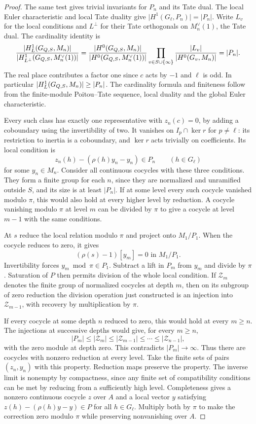 \begin{proof}
The same test gives trivial invariants for \(P_n\) and its Tate
dual. The local Euler characteristic and local Tate duality give
\(\lvert H^1(G_\ell,P_n)\rvert=\lvert P_n\rvert\). Write
\(L_v\) for the local conditions and \(L^\perp\) for their
Tate orthogonals on \(M_n^\vee(1)\), the Tate dual. The
cardinality identity is
\[
 \frac{|H^1_L(G_{Q,S},M_n)|}
 {|H^1_{L^\perp}(G_{Q,S},M_n^\vee(1))|}
 =\frac{|H^0(G_{Q,S},M_n)|}{|H^0(G_{Q,S},M_n^\vee(1))|}
 \prod_{v\in S\cup\{\infty\}}\frac{|L_v|}{|H^0(G_v,M_n)|}
 =|P_n|.
\]
The real place contributes a factor one since \(c\) acts
by \(-1\) and \(\ell\) is odd. In particular
\(|H^1_L(G_{Q,S},M_n)|\geq |P_n|\). The cardinality formula
and finiteness follow from the finite-module Poitou--Tate sequence,
local duality and the global Euler characteristic.
\cite[Chapter I, Theorems 4.10 and 5.1]{milne-duality}

Every such class has exactly one representative with \(z_n(c)=0\),
by adding a coboundary using the invertibility of two. It vanishes on
\(I_p\cap\ker r\) for \(p\ne\ell\): its restriction to inertia is
a coboundary, and \(\ker r\) acts trivially on coefficients. Its
local condition is
\[
 z_n(h)-(\rho(h)y_n-y_n)\in P_n\qquad(h\in G_\ell)
\]
for some \(y_n\in M_n\). Consider all continuous cocycles with these
three conditions. They form a finite group for each \(n\), since
they are normalized and unramified outside \(S\), and its size is
at least \(\lvert P_n\rvert\). If at some level every such cocycle
vanished modulo \(\pi\), this would also hold at every higher
level by reduction. A cocycle vanishing modulo \(\pi\) at level
\(m\) can be divided by \(\pi\) to give a cocycle at level \(m-1\)
with the same conditions.

At \(s\) reduce the local relation modulo \(\pi\) and project
onto \(M_1/P_1\). When the cocycle reduces to zero, it gives
\[
       (\rho(s)-1)[y_m]=0\text{ in }M_1/P_1 .
\]
Invertibility forces \(y_m\bmod\pi\in P_1\).
Subtract a lift in \(P_m\) from \(y_m\) and divide by \(\pi\).
Saturation of \(P\) then permits division of the whole local
condition. If \(\mathcal Z_m\) denotes the finite group of normalized
cocycles at depth \(m\), then on its subgroup of zero
reduction the division operation just constructed is an
injection into \(\mathcal Z_{m-1}\), with recovery by
multiplication by \(\pi\).

If every cocycle at some depth
\(n\) reduced to zero, this would hold at every \(m\ge n\).
The injections at successive depths would give, for every \(m\ge n\),
\[
 |P_m|\le|\mathcal Z_m|\le|\mathcal Z_{m-1}|\le\cdots\le
 |\mathcal Z_{n-1}|,
\]
with the zero module at depth zero. This contradicts \(|P_m|\to\infty\).
Thus there are cocycles with nonzero reduction at every level.
Take the finite sets of pairs \((z_n,y_n)\) with this property.
Reduction maps preserve the property. The inverse limit is nonempty
by compactness, since any finite set of compatibility conditions
can be met by reducing from a sufficiently high level. Completeness
gives a nonzero continuous cocycle \(z\) over \(A\) and a local vector \(y\) satisfying
\(z(h)-(\rho(h)y-y)\in P\) for all \(h\in G_\ell\). Multiply both by \(\pi\) to make the correction
zero modulo \(\pi\) while preserving nonvanishing over \(A\).


\end{proof}
